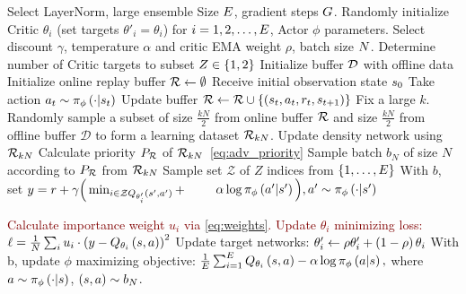 \begin{algorithm}[!t]
\caption{\algname}
\label{alg:a3rl}
\begin{algorithmic}[1]
\State Select LayerNorm, large ensemble Size $E$, gradient steps $G$.
\State Randomly initialize Critic $\theta_i$ (set targets $\theta'_i = \theta_i$) for $i=1,2,\ldots, E$, Actor $\phi$ parameters. 
\State Select discount $\gamma$, temperature $\alpha$ and critic EMA weight $\rho$, batch size $N$.
\State Determine number of Critic targets to subset $Z\in\left\{1,2\right\}$
\State Initialize buffer $\mathcal{D}$ with offline data
\State Initialize online replay buffer $\mathcal{R} \leftarrow \emptyset$ 
\State Receive initial observation state $s_0$
       \State Take action  $a_t \sim \pi_{\phi} \left( {\cdot|s_t} \right) $ 
       \State Update buffer $\mathcal{R} \leftarrow \mathcal{R} \cup \left\{ \left( {s_t,a_t,r_t,s_{t+1}} \right) \right\}$
       \State Fix a large $k$. Randomly sample a subset of size $ \frac{kN}{2}$ from online buffer $\mathcal{R}$ and size $\frac{kN}{2}$ from offline buffer $\mathcal{D}$ to form a learning dataset $\mathcal{R}_{kN}$.
       \State \textcolor{NavyBlue}{Update density network using $\mathcal{R}_{kN}$}
       \State
       \textcolor{NavyBlue}{Calculate priority $P_{\mathcal{R}}$ of $\mathcal{R}_{kN}$}~\eqref{eq:adv_priority}
            \State  \textcolor{NavyBlue}{Sample batch $b_N$ of size $N$ according to $P_{\mathcal{R}}$ from $\mathcal{R}_{kN}$}
            \State Sample set $\mathcal{Z}$ of $Z$ indices from $\left\{1,\ldots, E\right\}$ 
            \State With $b$, set $y=r+\gamma\Big(\min_{i\in \mathcal{Z}  Q_{\theta'_i} \left( {s',a'} \right) }+\Big.$ 
            \State $\quad \quad\Big.\alpha \log \pi_{\phi} \left( {a'|s'} \right) \Big), a'\sim \pi_{\phi} \left( {\cdot|s'} \right) $

            \State \textcolor{Maroon}{Calculate importance weight $u_i$ via \eqref{eq:weights}.}
            \State \textcolor{Maroon}{Update $\theta_i$ minimizing loss:}
            \State \textcolor{Maroon}{$\ell=\frac{1}{N} \sum_{i} u_i\cdot
             \left( {y-Q_{\theta_i} \left( {s,a} \right) } \right) ^2$}
            \EndFor
            \State Update target networks:
            \State $\theta'_{i}\leftarrow \rho \theta'_{i}+ \left( {1-\rho} \right) \theta_i$
       \EndFor
       \State With b, update $\phi$ maximizing objective:
       \State \quad\quad$\frac{1}{E}\sum_{i=1}^{E} Q_{\theta_i} \left( {s,a} \right)  - \alpha \log \pi_{\phi}  \left( {a|s} \right) ,$
       \State \quad\quad where $a\sim\pi_{\phi} \left( {\cdot|s} \right) $, {$ \left( {s,a} \right) \sim b_{N}$}.
     \EndFor
\EndWhile

\end{algorithmic}
\end{algorithm}


